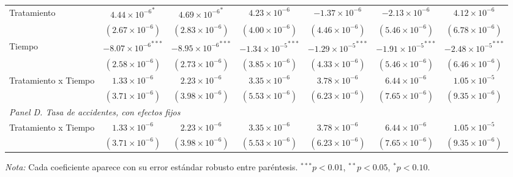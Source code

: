 \begin{table}[htbp]
\begin{adjustbox}{max width=\textwidth}
\begin{tabular}{lcccccc}
        Tratamiento & $4.44 \times {10^{-6}}^{*}$ & $4.69 \times {10^{-6}}^{*}$ & $4.23 \times 10^{-6}$ & $-1.37 \times 10^{-6}$ & $-2.13 \times 10^{-6}$ & $4.12 \times 10^{-6}$ \\
         & $(2.67 \times 10^{-6})$ & $(2.83 \times 10^{-6})$ & $(4.00 \times 10^{-6})$ & $(4.46 \times 10^{-6})$ & $(5.46 \times 10^{-6})$ & $(6.78 \times 10^{-6})$ \\
        Tiempo & $-8.07 \times {10^{-6}}^{***}$ & $-8.95 \times {10^{-6}}^{***}$ & $-1.34 \times {10^{-5}}^{***}$ & $-1.29 \times {10^{-5}}^{***}$ & $-1.91 \times {10^{-5}}^{***}$ & $-2.48 \times {10^{-5}}^{***}$ \\
         & $(2.58 \times 10^{-6})$ & $(2.73 \times 10^{-6})$ & $(3.85 \times 10^{-6})$ & $(4.33 \times 10^{-6})$ & $(5.46 \times 10^{-6})$ & $(6.46 \times 10^{-6})$ \\
        Tratamiento x Tiempo & $1.33 \times 10^{-6}$ & $2.23 \times 10^{-6}$ & $3.35 \times 10^{-6}$ & $3.78 \times 10^{-6}$ & $6.44 \times 10^{-6}$ & $1.05 \times 10^{-5}$ \\
         & $(3.71 \times 10^{-6})$ & $(3.98 \times 10^{-6})$ & $(5.53 \times 10^{-6})$ & $(6.23 \times 10^{-6})$ & $(7.65 \times 10^{-6})$ & $(9.35 \times 10^{-6})$ \\
        \midrule
        \multicolumn{7}{l}{\textit{Panel D. Tasa de accidentes, con efectos fijos}} \\
        Tratamiento x Tiempo & $1.33 \times 10^{-6}$ & $2.23 \times 10^{-6}$ & $3.35 \times 10^{-6}$ & $3.78 \times 10^{-6}$ & $6.44 \times 10^{-6}$ & $1.05 \times 10^{-5}$ \\
         & $(3.71 \times 10^{-6})$ & $(3.98 \times 10^{-6})$ & $(5.53 \times 10^{-6})$ & $(6.23 \times 10^{-6})$ & $(7.65 \times 10^{-6})$ & $(9.35 \times 10^{-6})$ \\

        \bottomrule
    \end{tabular}
    \end{adjustbox}

    \vspace{0.4em}
    \begin{minipage}{0.93\textwidth}
        \tiny \textit{Nota:} Cada coeficiente aparece con su error estándar robusto entre paréntesis. ${}^{***} p<0.01$, ${}^{**} p<0.05$, ${}^{*} p<0.10$.
    \end{minipage}
\end{table}

